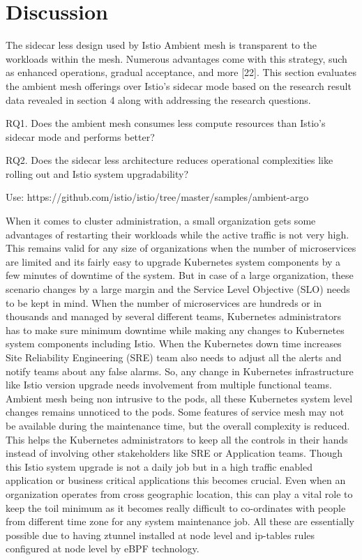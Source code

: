 \section{Discussion}
The sidecar less design used by Istio Ambient mesh is transparent to the workloads within the mesh. Numerous advantages come with this strategy, such as enhanced operations, gradual acceptance, and more [22]. This section evaluates the ambient mesh offerings over Istio's sidecar mode based on the research result data revealed in section 4 along with addressing the research questions.

RQ1. Does the ambient mesh consumes less compute resources than Istio's sidecar mode and performs better?


RQ2. Does the sidecar less architecture reduces operational complexities like rolling out and Istio system upgradability?

Use: https://github.com/istio/istio/tree/master/samples/ambient-argo

When it comes to cluster administration, a small organization gets some advantages of restarting their workloads while the active traffic is not very high. This remains valid for any size of organizations when the number of microservices are limited and its fairly easy to upgrade Kubernetes system components by a few minutes of downtime of the system. But in case of a large organization, these scenario changes by a large margin and the Service Level Objective (SLO) needs to be kept in mind. When the number of microservices are hundreds or in thousands and managed by several different teams, Kubernetes administrators has to make sure minimum downtime while making any changes to Kubernetes system components including Istio. When the Kubernetes down time increases Site Reliability Engineering (SRE) team also needs to adjust all the alerts and notify teams about any false alarms. So, any change in Kubernetes infrastructure like Istio version upgrade needs involvement from multiple functional teams. Ambient mesh being non intrusive to the pods, all these Kubernetes system level changes remains unnoticed to the pods. Some features of service mesh may not be available during the maintenance time, but the overall complexity is reduced. This helps the Kubernetes administrators to keep all the controls in their hands instead of involving other stakeholders like SRE or Application teams. Though this Istio system upgrade is not a daily job but in a high traffic enabled application or business critical applications this becomes crucial. Even when an organization operates from cross geographic location, this can play a vital  role to keep the toil minimum as it becomes really difficult to co-ordinates with people from different time zone for any system maintenance job. All these are essentially possible due to having ztunnel installed at node level and ip-tables rules configured at node level by eBPF technology.